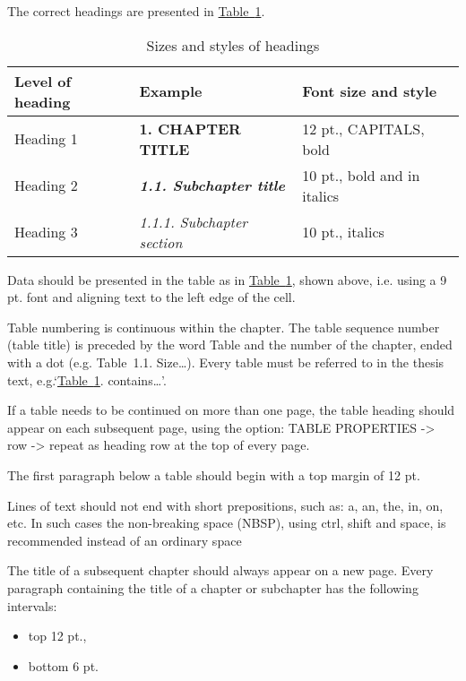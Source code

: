 The correct headings are presented in \hyperref[tab:heading-styles]{Table~\ref*{tab:heading-styles}}.

\begin{table}[h]
	\caption{Sizes and styles of headings}
	\label{tab:heading-styles}
	\begin{tabularx}{\textwidth}{|X|X|X|}
		\hline
		Level of heading	& Example 					& Font size and style \\ \hline
		Heading 1 			& \textbf{1. CHAPTER TITLE}			& 12 pt., CAPITALS, bold \\ \hline
		Heading 2			& \textbf{\textit{1.1. Subchapter title}}		& 10 pt., bold and in italics \\ \hline
		Heading 3			& \textit{1.1.1. Subchapter section}	& 10 pt., italics \\ \hline
	\end{tabularx}
\end{table}

Data should be presented in the table as in \hyperref[tab:heading-styles]{Table~\ref*{tab:heading-styles}}, shown above, i.e. using a 9 pt. font and aligning text to the left edge of the cell.

Table numbering is continuous within the chapter. The table sequence number (table title) is preceded by the word Table and the number of the chapter, ended with a dot (e.g. Table~1.1. Size\ldots). Every table must be referred to in the thesis text, e.g.`\hyperref[tab:heading-styles]{Table~\ref*{tab:heading-styles}}. contains\ldots'.

If a table needs to be continued on more than one page, the table heading should appear on each subsequent page, using the option: TABLE PROPERTIES -> row -> repeat as heading row at the top of every page.

The first paragraph below a table should begin with a top margin of 12 pt.

Lines of text should not end with short prepositions, such as: a, an, the, in, on, etc. In such cases the non-breaking space (NBSP), using ctrl, shift and space, is recommended instead of an ordinary space

The title of a subsequent chapter should always appear on a new page. Every paragraph containing the title of a chapter or subchapter has the following intervals:
\begin{itemize}
	\item top 12 pt.,
	\item bottom 6 pt.
\end{itemize}

